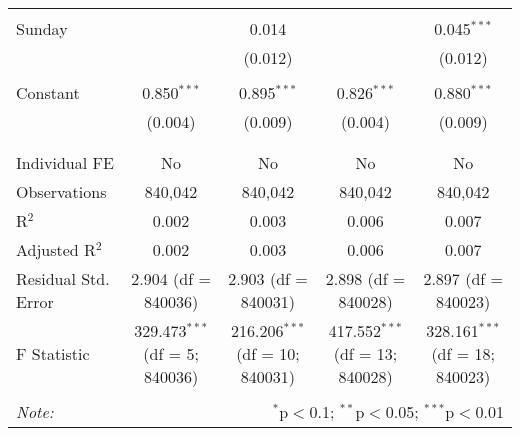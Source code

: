 \documentclass[
]{article}
\begin{document}
\begin{table}[!htbp]
{\begin{tabular}{@{\extracolsep{5pt}}lcccc}
  & & & & \\ 
 Sunday &  & 0.014 &  & 0.045$^{***}$ \\ 
  &  & (0.012) &  & (0.012) \\ 
  & & & & \\ 
 Constant & 0.850$^{***}$ & 0.895$^{***}$ & 0.826$^{***}$ & 0.880$^{***}$ \\ 
  & (0.004) & (0.009) & (0.004) & (0.009) \\ 
  & & & & \\ 
\hline \\[-1.8ex] 
Individual FE & No & No & No & No \\ 
Observations & 840,042 & 840,042 & 840,042 & 840,042 \\ 
R$^{2}$ & 0.002 & 0.003 & 0.006 & 0.007 \\ 
Adjusted R$^{2}$ & 0.002 & 0.003 & 0.006 & 0.007 \\ 
Residual Std. Error & 2.904 (df = 840036) & 2.903 (df = 840031) & 2.898 (df = 840028) & 2.897 (df = 840023) \\ 
F Statistic & 329.473$^{***}$ (df = 5; 840036) & 216.206$^{***}$ (df = 10; 840031) & 417.552$^{***}$ (df = 13; 840028) & 328.161$^{***}$ (df = 18; 840023) \\ 
\hline 
\hline \\[-1.8ex] 
\textit{Note:}  & \multicolumn{4}{r}{$^{*}$p$<$0.1; $^{**}$p$<$0.05; $^{***}$p$<$0.01} \\ 
\end{tabular}
} 
\end{table} 
\newpage
\end{document}
